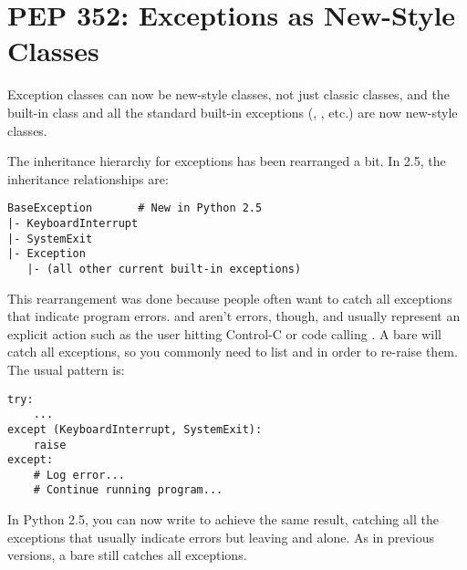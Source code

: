 \documentclass{howto}
\begin{document}
\begin{seealso}



\end{seealso}


\section{PEP 352: Exceptions as New-Style Classes\label{pep-352}}

Exception classes can now be new-style classes, not just classic
classes, and the built-in  class and all the
standard built-in exceptions (,
, etc.) are now new-style classes.

The inheritance hierarchy for exceptions has been rearranged a bit.
In 2.5, the inheritance relationships are:

\begin{verbatim}
BaseException       # New in Python 2.5
|- KeyboardInterrupt
|- SystemExit
|- Exception
   |- (all other current built-in exceptions)
\end{verbatim}

This rearrangement was done because people often want to catch all
exceptions that indicate program errors.   and
 aren't errors, though, and usually represent an explicit
action such as the user hitting Control-C or code calling
.  A bare  will catch all exceptions,
so you commonly need to list  and
 in order to re-raise them.  The usual pattern is:

\begin{verbatim}
try:
    ...
except (KeyboardInterrupt, SystemExit):
    raise
except: 
    # Log error...  
    # Continue running program...
\end{verbatim}

In Python 2.5, you can now write  to achieve
the same result, catching all the exceptions that usually indicate errors 
but leaving  and
 alone.  As in previous versions,
a bare  still catches all exceptions.
\end{document}
